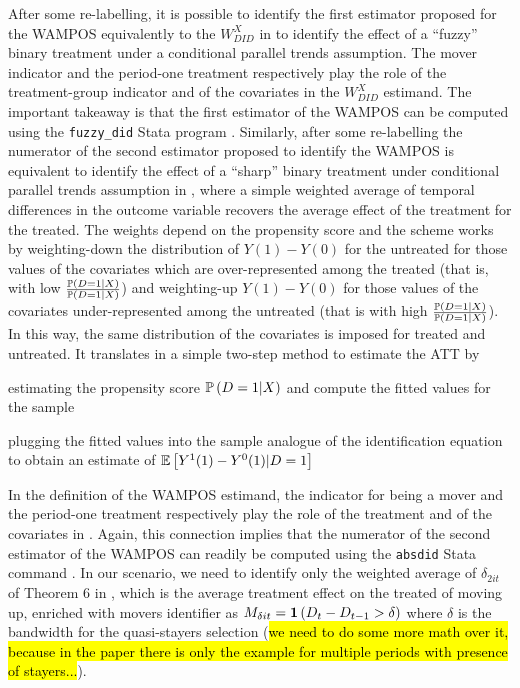 \documentclass[11pt]{article}
\begin{document}
After some re-labelling, it is possible to identify the first estimator proposed for the WAMPOS equivalently to the $W^{X}_{DID}$ in \citet{bib:dechaisemartin2018} to identify the effect of a ``fuzzy'' binary treatment under a conditional parallel trends assumption. The mover indicator and the period-one treatment respectively play the role of the treatment-group indicator and of the covariates in the $W^{X}_{DID}$ estimand. The important takeaway is that the first estimator of the WAMPOS can be computed using the \texttt{fuzzy\_did} Stata program \citep{bib:dechaisemartin2019}.
Similarly, after some re-labelling the numerator of the second estimator proposed to identify the WAMPOS is equivalent to identify the effect of a ``sharp'' binary treatment under conditional parallel trends assumption in \citet{bib:abadie2005}, where a simple weighted average of temporal differences in the outcome variable recovers the average effect of the treatment for the treated.
The weights depend on the propensity score and the scheme works by weighting-down the distribution of $Y(1) - Y(0)$ for the untreated for those values of the covariates which are over-represented among the treated (that is, with low $\frac{\mathbb{P}\left( D = 1 | X \right)}{\mathbb{P}\left( D = 1 | X \right)}$) and weighting-up $Y(1) - Y(0)$ for those values of the covariates under-represented among the untreated (that is with high $\frac{\mathbb{P}\left( D = 1 | X \right)}{\mathbb{P}\left( D = 1 | X \right)}$). In this way, the same distribution of the covariates is imposed for treated and untreated. It translates in a simple two-step method to estimate the ATT by
\begin{inlinelist}
    \item estimating the propensity score $\mathbb{P}\left( D = 1 | X \right)$ and compute the fitted values for the sample
    \item plugging the fitted values into the sample analogue of the identification equation to obtain an estimate of $\mathbb{E} \left[ Y^{1}(1) - Y^{0}(1) | D = 1 \right]$
\end{inlinelist}
In the definition of the WAMPOS estimand, the indicator for being a mover and the period-one treatment respectively play the role of the treatment and of the covariates in \citet{bib:abadie2005}. Again, this connection implies that the numerator of the second estimator of the WAMPOS can readily be computed using the \texttt{absdid} Stata command \citep[see][]{bib:houngbedji2016}. In our scenario, we need to identify only the weighted average of $\delta_{2it}$ of Theorem 6 in \citet{bib:dechaisemartin2022b}, which is the average treatment effect on the treated of moving up, enriched with movers identifier as $M_{\delta i t} = \mathbf{1}\left( D_{t} - D_{t-1} > \delta \right)$ where $\delta$ is the bandwidth for the quasi-stayers selection (\hl{we need to do some more math over it, because in the paper there is only the example for multiple periods with presence of stayers...}).
\end{document}
